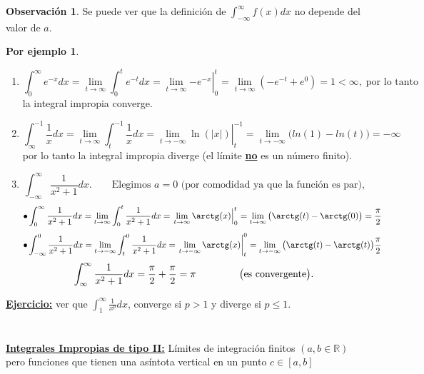 \documentclass{article}
\theoremstyle{definition}
\newtheorem*{obs}{Observación}
\newtheorem*{ej}{Por ejemplo}
\theoremstyle{remark}
\newcommand\R{\ensuremath{\mathbb{R}}}
\newcommand\infi{\infty}
\begin{document}
\begin{obs}
  Se puede ver que la definición de $\int_{-\infi}^{\infi}{f(x)dx}$ no depende del valor de $a$.
\end{obs}
\begin{ej} \; \\
\begin{enumerate}
  \item \[\int_{0}^{\infi}{e^{-x}dx}
  =
  \lim_{t\to \infi}{\int_{0}^{t}{e^{-t}dx}}
  =
  \left.    \lim_{t\to \infi}{-e^{-x}}    \right\vert_0^t
  =
  \lim_{t \to \infi }{\left(-e^{-t}+e^0\right)}
  =
  1<\infi, \; \text{por lo tanto}
  \]
  la integral impropia converge.
  \item \[
\int_{\infi}^{-1}{\frac{1}{x}dx}
=
\lim_{t\to \infi}{\int_{t}^{-1}{\frac{1}{x}dx}}
=
\left.    \lim_{t  \to -\infi}{\ln{(|x|)}} \right\vert_t^{-1}
=
\lim_{t \to -\infi}{\big(ln(1)-ln(t)\big)}
=
-\infi
\]
por lo tanto la integral impropia diverge (el límite \underline{\textbf{no}} es un número finito).
\item \[
\int_{-\infi}^{\infi}{\frac{1}{x^2+1}dx}.\quad\quad \text{Elegimos $a=0$ (por comodidad ya que la función es par),} \]
\[
 \bullet \int_{0}^{\infi}{\frac{1}{x^2+1}dx}
=
\lim_{t \to \infi}{\int_{0}^{t}{\frac{1}{x^2+1}dx}}
=
\left.\lim_{t \to \infi}{\arctg (x)}\right\vert_0^t
=
\lim_{t \to \infi}{\big(\arctg(t)-\arctg(0)\big)}
=
\frac{\pi}{2}
\]
\[
\bullet \int_{-\infi}^{0}{\frac{1}{x^2+1}dx}
=
\lim_{t \to -\infi}{\int_{t}^{0}{\frac{1}{x^2+1}dx}
=
\left.\lim_{t \to -\infi }{\arctg(x)}\right\vert_t^0
=
\lim_{t \to -\infi}{\big(\arctg(t)-\arctg(t)\big)}
\frac{\pi}{2}}
\]
\[
\int_{\infi}^{\infi}{\frac{1}{x^2+1}dx}
=
\frac{\pi}{2}+\frac{\pi}{2}
=
\pi\quad\quad\quad\quad\text{ \big(es convergente\big)}.
\]
\end{enumerate}
\end{ej}
\textbf{\underline{Ejercicio:}} ver que $\int_{1}^{\infi}{\frac{1}{x^p}dx}$, converge si $p>1$ y diverge si $p\leq 1$.\\
\\\\
\textbf{\underline{Integrales Impropias de tipo II:}} Límites de integración finitos $(a,b \in \R)$ pero funciones que tienen una asíntota vertical en un punto $c \in [a,b]$
\end{document}
